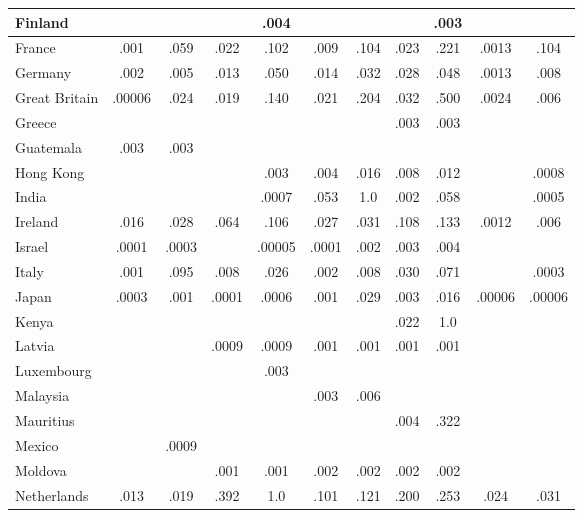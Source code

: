 \begin{table*}[h!]
\begin{tabular}{|P{37mm}|cc|cc|cc|cc|cc|}
Finland             &     &   &     &.004  &    &   &    &.003     &  & \\\hline
France             &.001     &.059   &.022     &.102  &.009    &.104   &.023    &.221     &.0013  &.104 \\\hline
Germany             &.002     &.005   &.013     &.050  &.014    &.032   &.028    &.048     &.0013  &.008 \\\hline
Great Britain             &.00006     &.024   &.019     &.140  &.021    &.204   &.032    &.500     &.0024  &.006 \\\hline
Greece             &     &   &     &  &   &  &.003    &.003     &  & \\\hline
Guatemala             &.003     &.003   &     &  &   &   &    &     &  & \\\hline
Hong Kong             &     &   &     &.003  &.004   &.016   &.008   &.012     &  &.0008 \\\hline
India             &    &   &     &.0007  &.053   &1.0   &.002    &.058     &  &.0005 \\\hline
Ireland             &.016     &.028   &.064     &.106  &.027    &.031   &.108    &.133     &.0012  &.006 \\\hline
Israel             &.0001     &.0003   &     &.00005  &.0001    &.002   &.003    &.004     &  & \\\hline
Italy            &.001     &.095   &.008    &.026  &.002    &.008   &.030    &.071     &  &.0003 \\\hline
Japan             &.0003     &.001   &.0001     &.0006  &.001    &.029   &.003    &.016     &.00006  &.00006 \\\hline
Kenya             &    &   &     &  &   &   &.022    &1.0     &  & \\\hline
Latvia             &     &  &.0009     &.0009  &.001    &.001   &.001    &.001     &  & \\\hline
Luxembourg             &    &   &     &.003  &    &   &    &     &  & \\\hline
Malaysia             &     &  &     &  &.003    &.006   &    &     &  & \\\hline
Mauritius             &     &   &     &  &    &   &.004    &.322     &  & \\\hline
Mexico             &     &.0009   &     &  &    &   &    &    &  & \\\hline
Moldova             &     &   &.001     &.001  &.002    &.002   &.002    &.002     &  & \\\hline
Netherlands             &.013     &.019   &.392     &1.0  &.101    &.121   &.200    &.253     &.024  &.031 \\\hline

\end{tabular}
\end{table*}
